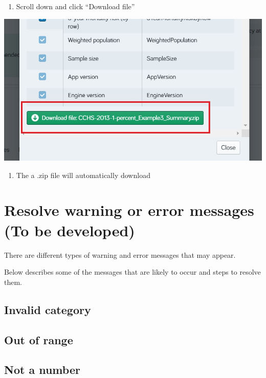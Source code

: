 \documentclass[]{book}
\providecommand{\tightlist}{%
  \setlength{\itemsep}{0pt}\setlength{\parskip}{0pt}}
\begin{document}
\begin{enumerate}
\def\labelenumi{\arabic{enumi}.}
\setcounter{enumi}{3}
\tightlist
\item
  Scroll down and click ``Download file''
\end{enumerate}

\begin{center}\includegraphics{Images/Results-Download4} \end{center}

\begin{enumerate}
\def\labelenumi{\arabic{enumi}.}
\setcounter{enumi}{4}
\tightlist
\item
  The a .zip file will automatically download
\end{enumerate}

\section{Resolve warning or error messages (To be
developed)}\label{resolve-warning-or-error-messages-to-be-developed}

There are different types of warning and error messages that may appear.

Below describes some of the messages that are likely to occur and steps
to resolve them.

\subsection{Invalid category}\label{invalid-category}

\subsection{Out of range}\label{out-of-range}

\subsection{Not a number}\label{not-a-number}
\end{document}
